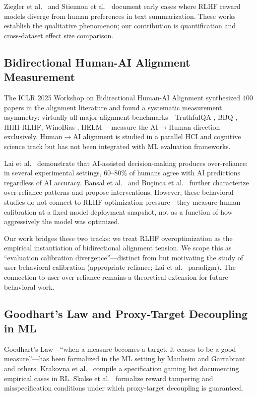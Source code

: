 Ziegler et al.~\cite{Ziegler2019Fine} and Stiennon et al.~\cite{Stiennon2020Learning} document early cases where RLHF reward models diverge from human preferences in text summarization. These works establish the qualitative phenomenon; our contribution is quantification and cross-dataset effect size comparison.

\subsection{Bidirectional Human-AI Alignment Measurement}

The ICLR 2025 Workshop on Bidirectional Human-AI Alignment synthesized 400 papers in the alignment literature and found a systematic measurement asymmetry: virtually all major alignment benchmarks---TruthfulQA \cite{Lin2022TruthfulQA}, BBQ \cite{Parrish2022BBQ}, HHH-RLHF, WinoBias \cite{Zhao2018Gender}, HELM \cite{Liang2023Holistic}---measure the AI$\to$Human direction exclusively. Human$\to$AI alignment is studied in a parallel HCI and cognitive science track but has not been integrated with ML evaluation frameworks.

Lai et al.~\cite{Lai2021Understanding} demonstrate that AI-assisted decision-making produces over-reliance: in several experimental settings, 60--80\% of humans agree with AI predictions regardless of AI accuracy. Bansal et al.~\cite{Bansal2021Does} and Bu\c{c}inca et al.~\cite{Buccinca2021Trust} further characterize over-reliance patterns and propose interventions. However, these behavioral studies do not connect to RLHF optimization pressure---they measure human calibration at a fixed model deployment snapshot, not as a function of how aggressively the model was optimized.

Our work bridges these two tracks: we treat RLHF overoptimization as the empirical instantiation of bidirectional alignment tension. We scope this as ``evaluation calibration divergence''---distinct from but motivating the study of user behavioral calibration (appropriate reliance; Lai et al.~\cite{Lai2021Understanding} paradigm). The connection to user over-reliance remains a theoretical extension for future behavioral work.

\subsection{Goodhart's Law and Proxy-Target Decoupling in ML}

Goodhart's Law---``when a measure becomes a target, it ceases to be a good measure''---has been formalized in the ML setting by Manheim and Garrabrant~\cite{Manheim2019Categorizing} and others. Krakovna et al.~\cite{Krakovna2020Specification} compile a specification gaming list documenting empirical cases in RL. Skalse et al.~\cite{Skalse2022Defining} formalize reward tampering and misspecification conditions under which proxy-target decoupling is guaranteed.

